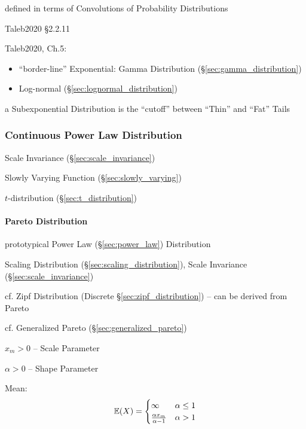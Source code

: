 defined in terms of Convolutions of Probability Distributions

Taleb2020 \S 2.2.11

Taleb2020, Ch.5:

\begin{itemize}
  \item ``border-line'' Exponential: Gamma Distribution
    (\S\ref{sec:gamma_distribution})
  \item Log-normal (\S\ref{sec:lognormal_distribution})
\end{itemize}

a Subexponential Distribution is the ``cutoff'' between ``Thin'' and ``Fat''
Tails



\subsubsection{Continuous Power Law Distribution}
\label{sec:continuous_power_law}

Scale Invariance (\S\ref{sec:scale_invariance})

Slowly Varying Function (\S\ref{sec:slowly_varying})

$t$-distribution (\S\ref{sec:t_distribution})



\paragraph{Pareto Distribution}\label{sec:pareto_distribution}\hfill

prototypical Power Law (\S\ref{sec:power_law}) Distribution

Scaling Distribution (\S\ref{sec:scaling_distribution}),
Scale Invariance (\S\ref{sec:scale_invariance})

cf. Zipf Distribution (Discrete \S\ref{sec:zipf_distribution}) -- can be derived
from Pareto

cf. Generalized Pareto (\S\ref{sec:generalized_pareto})

$x_m > 0$ -- Scale Parameter

$\alpha > 0$ -- Shape Parameter

Mean:
\[
  \mathbb{E}(X) = \begin{cases}
    \infty                      & \alpha \leq 1 \\
    \frac{\alpha x_m}{\alpha-1} & \alpha > 1 \\
  \end{cases}
\]

